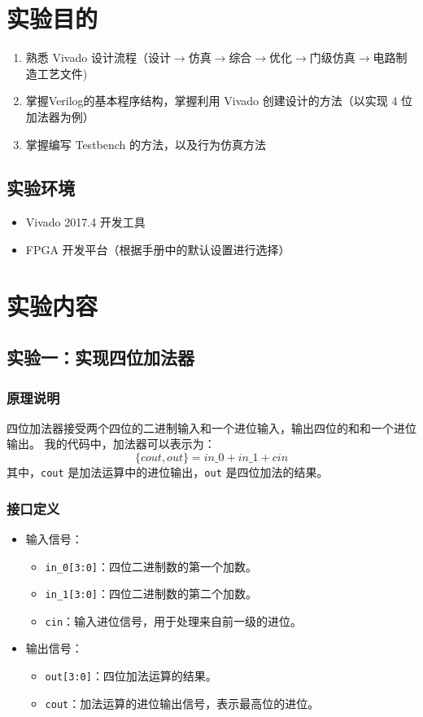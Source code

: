 \documentclass[zihao=5, UTF8]{article}
\theoremstyle{MyLineTheoremStyle} %
\theoremstyle{MyBlockTheoremStyle} %
\theoremstyle{MySubsubsectionStyle} %
\begin{document}
\section{实验目的}\thispagestyle{fancy} 
\begin{enumerate}
    \item 熟悉 Vivado 设计流程（设计$\rightarrow$仿真$\rightarrow$综合$\rightarrow$优化$\rightarrow$门级仿真$\rightarrow$电路制造工艺文件)
    \item 掌握Verilog的基本程序结构，掌握利用 Vivado 创建设计的方法（以实现 4 位加法器为例）
    \item 掌握编写 Testbench 的方法，以及行为仿真方法
\end{enumerate}

\subsection{实验环境}
\begin{itemize}
    \item Vivado 2017.4 开发工具
    \item FPGA 开发平台（根据手册中的默认设置进行选择）
\end{itemize}


\section{实验内容}
\subsection{实验一：实现四位加法器}
\subsubsection{原理说明}
四位加法器接受两个四位的二进制输入和一个进位输入，输出四位的和和一个进位输出。
我的代码中，加法器可以表示为：
\[
\{cout, out\} = in\_0 + in\_1 + cin
\]
其中，\texttt{cout} 是加法运算中的进位输出，\texttt{out} 是四位加法的结果。
\subsubsection{接口定义}
\begin{itemize}
    \item 输入信号：
    \begin{itemize}
        \item \texttt{in\_0[3:0]}：四位二进制数的第一个加数。
        \item \texttt{in\_1[3:0]}：四位二进制数的第二个加数。
        \item \texttt{cin}：输入进位信号，用于处理来自前一级的进位。
    \end{itemize}
    \item 输出信号：
    \begin{itemize}
        \item \texttt{out[3:0]}：四位加法运算的结果。
        \item \texttt{cout}：加法运算的进位输出信号，表示最高位的进位。
    \end{itemize}
\end{itemize}
\end{document}
